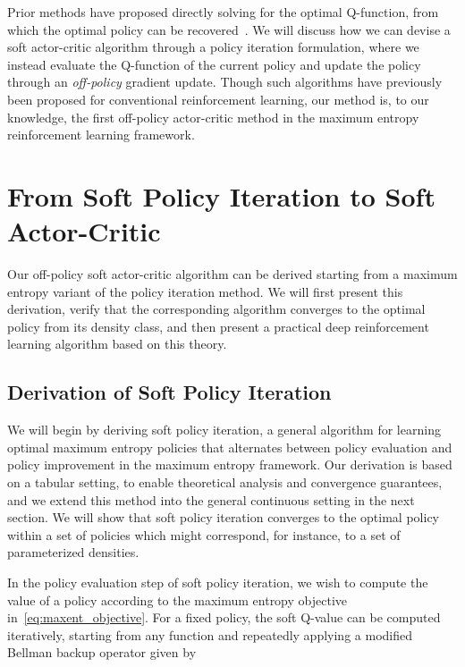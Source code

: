 \documentclass{article}
\begin{document}
Prior methods have proposed directly solving for the optimal Q-function, from which the optimal policy can be recovered~\citep{ziebart2008maximum,fox2015taming,haarnoja2017reinforcement}. We will discuss how we can devise a soft actor-critic algorithm through a policy iteration formulation, where we instead evaluate the Q-function of the current policy and update the policy through an \emph{off-policy} gradient update. Though such algorithms have previously been proposed for conventional reinforcement learning, our method is, to our knowledge, the first off-policy actor-critic method in the maximum entropy reinforcement learning framework.


\section{From Soft Policy Iteration to Soft Actor-Critic} 
\label{sec:soft_policy_iteration}

Our off-policy soft actor-critic algorithm can be derived starting from a maximum entropy variant of the policy iteration method. We will first present this derivation, verify that the corresponding algorithm converges to the optimal policy from its density class, and then present a practical deep reinforcement learning algorithm based on this theory.

\subsection{Derivation of Soft Policy Iteration}

We will begin by deriving soft policy iteration, a general algorithm for learning optimal maximum entropy policies that alternates between policy evaluation and policy improvement in the maximum entropy framework. Our derivation is based on a tabular setting, to enable theoretical analysis and convergence guarantees, and we extend this method into the general continuous setting in the next section. We will show that soft policy iteration converges to the optimal policy within a set of policies which might correspond, for instance, to a set of parameterized densities.

In the policy evaluation step of soft policy iteration, we wish to compute the value of a policy  according to the maximum entropy objective in~\autoref{eq:maxent_objective}. For a fixed policy, the soft Q-value can be computed iteratively, starting from any function  and repeatedly applying a modified Bellman backup operator  given by
\end{document}

